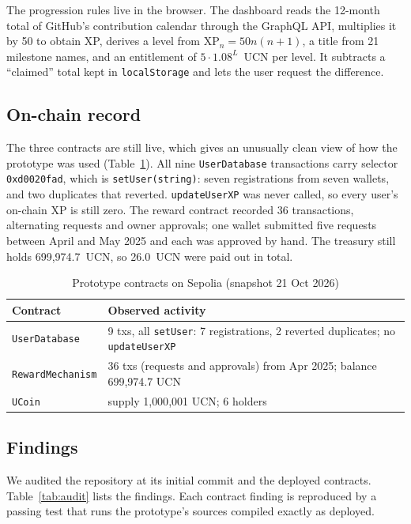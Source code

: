 \documentclass[conference]{IEEEtran}
\newcommand{\XP}{\mathrm{XP}}
\begin{document}
The progression rules live in the browser. The dashboard reads the 12-month total of GitHub's contribution calendar through the GraphQL API, multiplies it by 50 to obtain XP, derives a level from $\XP_n = 50n(n+1)$, a title from 21 milestone names, and an entitlement of $5 \cdot 1.08^{L}$~UCN per level. It subtracts a ``claimed'' total kept in \texttt{localStorage} and lets the user request the difference.

\subsection{On-chain record}
The three contracts are still live, which gives an unusually clean view of how the prototype was used (Table~\ref{tab:sepolia}). All nine \texttt{UserDatabase} transactions carry selector \texttt{0xd0020fad}, which is \texttt{setUser(string)}: seven registrations from seven wallets, and two duplicates that reverted. \texttt{updateUserXP} was never called, so every user's on-chain XP is still zero. The reward contract recorded 36 transactions, alternating requests and owner approvals; one wallet submitted five requests between April and May 2025 and each was approved by hand. The treasury still holds 699{,}974.7~UCN, so 26.0~UCN were paid out in total.

\begin{table}[t]
\centering
\caption{Prototype contracts on Sepolia (snapshot 21 Oct 2026)}
\label{tab:sepolia}
\footnotesize
\setlength{\tabcolsep}{3pt}
\begin{tabular}{@{}lp{5.3cm}@{}}
\toprule
\textbf{Contract} & \textbf{Observed activity}\\
\midrule
\texttt{UserDatabase} & 9 txs, all \texttt{setUser}: 7 registrations, 2 reverted duplicates; no \texttt{updateUserXP}\\
\texttt{RewardMechanism} & 36 txs (requests and approvals) from Apr 2025; balance 699{,}974.7 UCN\\
\texttt{UCoin} & supply 1{,}000{,}001 UCN; 6 holders\\
\bottomrule
\end{tabular}
\end{table}

\subsection{Findings}
We audited the repository at its initial commit and the deployed contracts. Table~\ref{tab:audit} lists the findings. Each contract finding is reproduced by a passing test that runs the prototype's sources compiled exactly as deployed.
\end{document}

